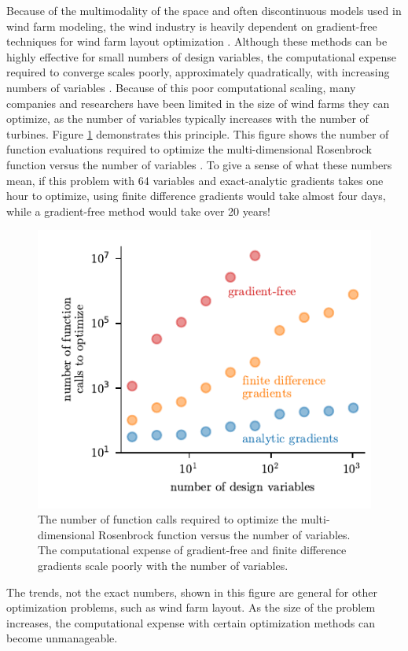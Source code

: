 \documentclass[wes, manuscript]{copernicus}
\begin{document}
Because of the multimodality of the space and often discontinuous models used in wind farm modeling, the wind industry is heavily dependent on gradient-free techniques for wind farm layout optimization  \citep{herbert2014review}.
Although these methods can be highly effective for small numbers of design variables, the computational expense required to converge scales poorly, approximately quadratically, with increasing numbers of variables \citep{singg2008,rios2013,lyu2014,Ning2016a,Thomas2018}. Because of this poor computational scaling, many companies and researchers have been limited in the size of wind farms they can optimize, as the number of variables typically increases with the number of turbines. Figure \ref{scale} demonstrates this principle. This figure shows the number of function evaluations required to optimize the multi-dimensional Rosenbrock function versus the number of variables \citep{rosenbrock1960automatic}. To give a sense of what these numbers mean, if this problem with 64 variables and exact-analytic gradients takes one hour to optimize, using finite difference gradients would take almost four days, while a gradient-free method would take over 20 years!
%
\begin{figure}
\centering
\includegraphics{paper-figures/scaling}
\caption{The number of function calls required to optimize the multi-dimensional Rosenbrock function versus the number of variables. The computational expense of gradient-free and finite difference gradients scale poorly with the number of variables.}
\label{scale}
\end{figure}
%
The trends, not the exact numbers, shown in this figure are general for other optimization problems, such as wind farm layout. As the size of the problem increases, the computational expense with certain optimization methods can become unmanageable.
\end{document}
